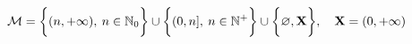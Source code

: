 \documentclass[preview]{standalone}
\begin{document}
\[\mathcal{M} = \biggl\{{(n,+\infty),\:n\in\mathbb{N}_0}\biggr\}\cup \biggl\{{(0,n],\:n\in\mathbb{N}^+}\biggr\}\cup \biggl\{{\varnothing,\mathbf{X}}\biggr\}, \quad \mathbf{X}=(0,+\infty)\]
\end{document}
